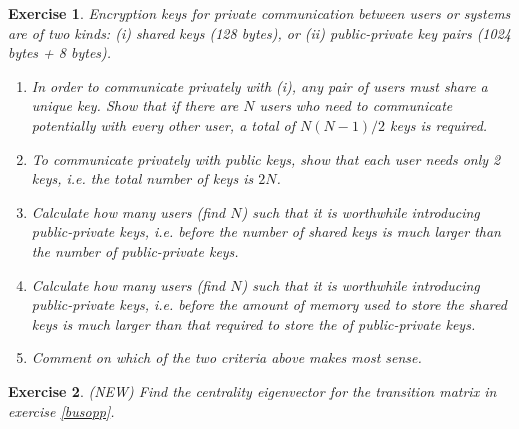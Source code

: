 \documentclass{book}
\newtheorem{exercise}{Exercise}
\begin{document}
\begin{exercise} 
Encryption keys for private communication between users or systems are
of two kinds: (i) shared keys (128 bytes), or (ii) public-private key
pairs (1024 bytes + 8 bytes).
\begin{enumerate}
\item In order to communicate privately with (i), any pair of users must share
a unique key. Show that if there are $N$ users who need to communicate potentially
with every other user, a total of $N(N-1)/2$ keys is required.

\item To communicate privately with public keys, show that each user needs only 2 keys,
i.e. the total number of keys is $2N$.

\item Calculate how many users (find $N$) such that it is worthwhile introducing
public-private keys, i.e. before the number of shared keys is much
larger than the number of public-private keys.

\item Calculate how many users (find $N$) such that it is worthwhile introducing
public-private keys, i.e. before the amount of memory used to store
the shared keys is much larger than that required to store the of
public-private keys.

\item Comment on which of the two criteria above makes most sense.
\end{enumerate}
\end{exercise}
\begin{solution}
\end{solution}


\begin{exercise} 
(NEW) Find the centrality eigenvector for the transition matrix
in exercise \ref{busopp}.
\end{exercise}
\begin{solution}
\end{solution}
\end{document}
